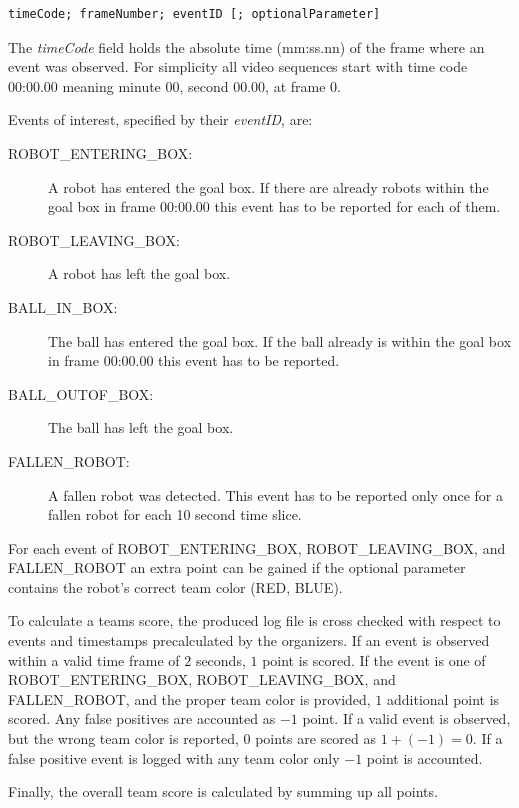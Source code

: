 \documentclass[12pt]{article}
\begin{document}
\begin{verbatim}
timeCode; frameNumber; eventID [; optionalParameter]	
\end{verbatim}

The \emph{timeCode} field holds the absolute time (mm:ss.nn) of the frame where an event was observed. For simplicity all video sequences start with time code 00:00.00 meaning minute 00, second 00.00, at frame $0$.

Events of interest, specified by their \emph{eventID}, are:

\begin{description}
	\item[ROBOT\_ENTERING\_BOX:] A robot has entered the goal box. If there are already robots within the goal box in frame 00:00.00 this event has to be reported for each of them.
	\item[ROBOT\_LEAVING\_BOX:] A robot has left the goal box. 
	\item[BALL\_IN\_BOX:] The ball has entered the goal box. If the ball already is within the goal box in frame 00:00.00 this event has to be reported.
	\item[BALL\_OUTOF\_BOX:] The ball has left the goal box.
	\item[FALLEN\_ROBOT:] A fallen robot was detected. This event has to be reported only once for a fallen robot for each 10 second time slice.
\end{description}

For each event of ROBOT\_ENTERING\_BOX, ROBOT\_LEAVING\_BOX, and FALLEN\_ROBOT an extra point can be gained if the optional parameter contains the robot's correct team color (RED, BLUE). 

To calculate a teams score, the produced log file is cross checked with respect to events and timestamps precalculated by the organizers. If an event is observed within a valid time frame of $2$ seconds, $1$ point is scored. If the event is one of ROBOT\_ENTERING\_BOX, ROBOT\_LEAVING\_BOX, and FALLEN\_ROBOT, and the proper team color is provided, $1$ additional point is scored. Any false positives are accounted as $-1$ point. If a valid event is observed, but the wrong team color is reported, $0$ points are scored as $1+(-1)=0$. If a false positive event is logged with any team color only $-1$ point is accounted. 

Finally, the overall team score is calculated by summing up all points.


\newpage


\end{document}

